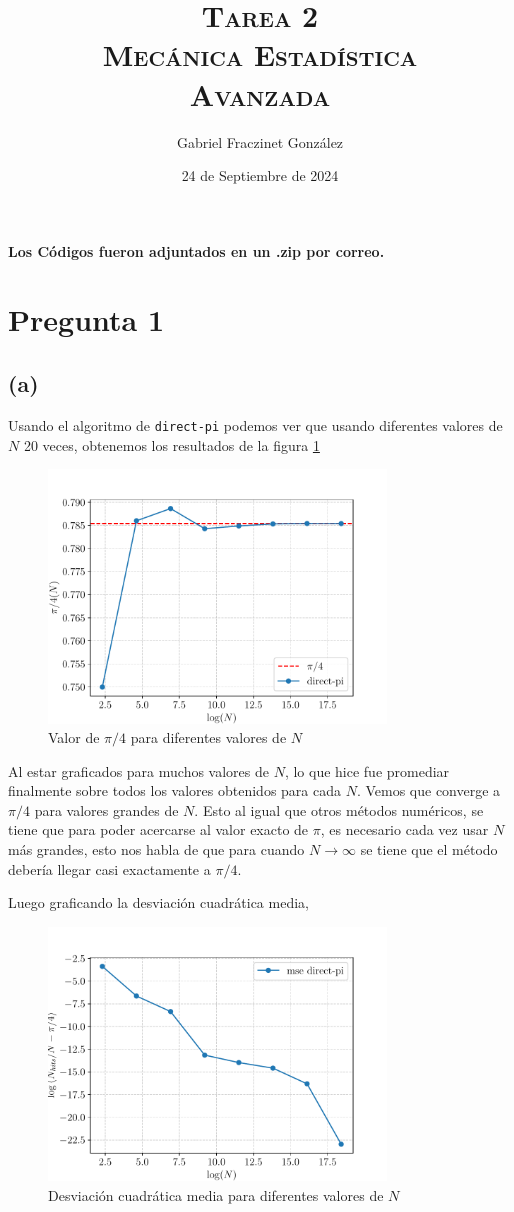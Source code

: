 \documentclass[11pt,a4paper]{article}
\title{\vspace*{-.1cm} \Large \textsc{ \LARGE Tarea 2 \\ Mecánica Estadística \\ Avanzada}}
\author{\large Gabriel Fraczinet González }
\date{\large 24 de Septiembre de 2024}
\begin{document}
\clearpage
\maketitle
\firstpage{}
\textbf{Los Códigos fueron adjuntados en un .zip por correo.}
\section*{Pregunta 1}
\subsection*{(a)} 
Usando el algoritmo de \texttt{direct-pi} podemos ver que usando diferentes valores de $N$ 20 veces, obtenemos los resultados de la figura \ref{fig:p1_1}
\begin{figure}[H]
    \centering
    \includegraphics[width=0.8\textwidth]{p1/a/pi_q.pdf}
    \caption{Valor de $\pi/4$ para diferentes valores de $N$}
    \label{fig:p1_1}
\end{figure}
Al estar graficados para muchos valores de $N$, lo que hice fue 
promediar finalmente sobre todos los valores obtenidos para cada $N$.
Vemos que converge a $\pi/4$ para valores grandes de $N$. Esto al igual que otros métodos numéricos, se tiene que para poder acercarse al valor exacto de $\pi$, es necesario cada vez usar $N$ más grandes, esto nos habla 
de que para cuando $N \to \infty$ se tiene que el método debería llegar casi exactamente a $\pi/4$.
\par
Luego graficando la desviación cuadrática media,
\begin{figure}[H]
    \centering
    \includegraphics[width=0.8\textwidth]{p1/a/mse.pdf}
    \caption{Desviación cuadrática media para diferentes valores de $N$}
    \label{fig:p1_2}
\end{figure}
\end{document}
